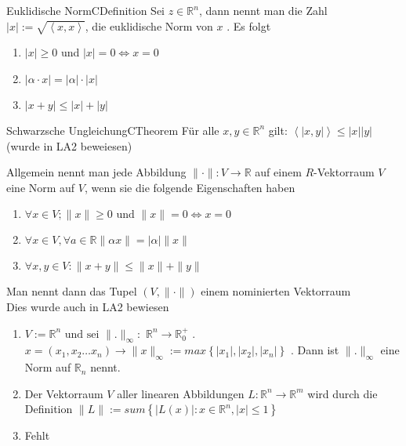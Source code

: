 \documentclass[a4paper]{memoir}
\begin{document}
\begin{ibox}{Euklidische Norm}{CDefinition}
   Sei $ z \in \mathbb{R}^n $, dann nennt man die Zahl $ \left| x \right| :=
   \sqrt{ \left<x,x \right>}$, die euklidische Norm von $ x $ . Es folgt 
   \begin{enumerate}[label=\alph*)]
       \item $ \left| x \right| \geq 0  $ und $ \left| x \right| = 0 \iff x = 0$
       \item $ \left| \alpha \cdot x \right|  = \left| \alpha \right| \cdot
           \left| x \right| $ 
       \item $ \left| x + y \right| \leq \left| x \right| + \left| y \right|  $ 
   \end{enumerate}
\end{ibox}

\begin{ibox}{Schwarzsche Ungleichung}{CTheorem}
    Für alle $ x, y \in \mathbb{R}^{n} $ gilt: $ \left< \left| x,y \right| \right>
    \leq \left| x \right| \left| y \right| $  
    \\ (wurde in LA2 beweiesen)
\end{ibox}
Allgemein nennt man jede Abbildung $ \| \cdot \| : V \to \mathbb{R} $ auf einem $
R $-Vektorraum $ V $ eine Norm auf $ V $, wenn sie die folgende Eigenschaften
haben
\begin{enumerate}[label=\alph*)]
    \item $ \forall x \in V; \| x \| \geq 0 \text{ und } \| x \|=0 \iff x=0 $ 
    \item $ \forall x \in V, \forall a \in \mathbb{R} \| \alpha x  \| =
        \left| \alpha \right| \|x \| $ 
	\item $ \forall x, y \in V : \| x+y \| \leq \|x \| + \|y \| $ 
\end{enumerate}
Man nennt dann das Tupel $ \left( V, \| \cdot \| \right)  $ einem nominierten
Vektorraum \\
Dies wurde auch in LA2 bewiesen


\begin{enumerate}[label=\alph*)]
    \item $ V := \mathbb{R}^{n} \text{ und sei } \|. \|_{\infty}:$
        $\mathbb{R}^{n} \to \mathbb{R}_{0}^+$ . $ x = \left( x_1,x_2 \dots
        x_{n}\right) \to \|x \|_{\infty}:= max \left\{ \left| x_1 \right| , \left| x_2 \right|, \left| x_{n} \right| \right\}$ . Dann ist $ \|. \|_{
    \infty}$ eine Norm auf $ \mathbb{R}_{n} $ nennt.
    \item Der Vektorraum $ V $ aller linearen Abbildungen $ L : \mathbb{R}^n
        \to \mathbb{R}^m$ wird durch die Definition $ \|L \|:= sum \left\{ 
        \left| L(x)\right| : x \in \mathbb{R}^{n}, \left| x \right| 
    \leq 1 \right\}  $ 
    \item Fehlt
\end{enumerate}
\end{document}
